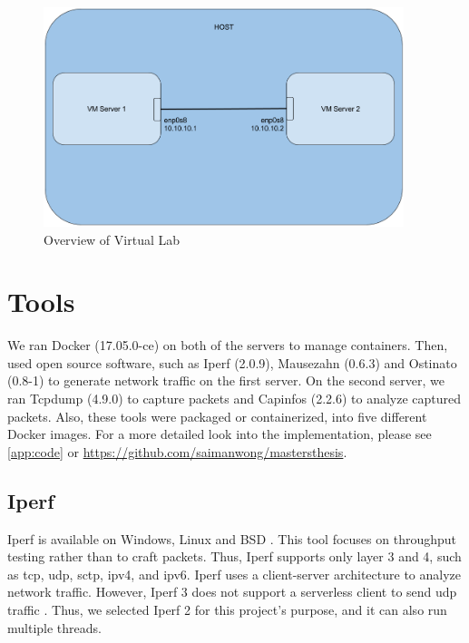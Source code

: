 \begin{figure}[h!]
    \centering
    \includegraphics[width=10.5cm]{figure/vmenv}
    \caption{Overview of Virtual Lab}
    \label{fig:vmenv}
\end{figure}

%
%
\hfill\break
\section{Tools}
We ran Docker (17.05.0-ce) on both of the servers to manage containers.
Then, used open source software, such as Iperf (2.0.9), Mausezahn (0.6.3) and Ostinato (0.8-1) to generate network traffic on the first server.
On the second server, we ran Tcpdump (4.9.0) to capture packets and Capinfos (2.2.6) to analyze captured packets.
Also, these tools were packaged or containerized, into five different Docker images.
For a more detailed look into the implementation, please see \cref{app:code} or \url{https://github.com/saimanwong/mastersthesis}.

\subsection{Iperf}
Iperf is available on Windows, Linux and BSD \cite{iperf2do7:online, iPerfThe63:online}.
This tool focuses on throughput testing rather than to craft packets.
Thus, Iperf supports only layer 3 and 4, such as \acrshort{tcp}, \acrshort{udp}, \acrshort{sctp}, \acrshort{ipv4}, and \acrshort{ipv6}.
Iperf uses a client-server architecture to analyze network traffic.
However, Iperf 3 does not support a serverless client to send \acrshort{udp} traffic \cite{Serverle80:online}.
Thus, we selected Iperf 2 for this project's purpose, and it can also run multiple threads.

